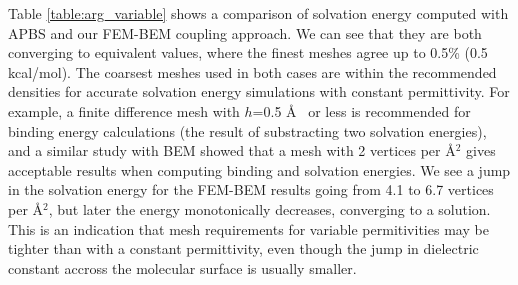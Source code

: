 Table \ref{table:arg_variable} shows a comparison of solvation energy computed with APBS and our FEM-BEM coupling approach. We can see that they are both converging to equivalent values, where the finest meshes agree up to 0.5\% (0.5 kcal/mol). The coarsest meshes used in both cases are within the recommended densities for accurate solvation energy simulations with constant permittivity. For example, a finite difference mesh with $h$=0.5 \AA~ or less is recommended for binding energy calculations\cite{sorensen2015comprehensive} (the result of substracting two solvation energies), and a similar study with BEM\cite{CooperBardhanBarba2014} showed that a mesh with 2 vertices per \AA$^2$ gives acceptable results when computing binding and solvation energies. We see a jump in the solvation energy for the FEM-BEM results going from 4.1 to 6.7 vertices per \AA$^2$, but later the energy monotonically decreases, converging to a solution. This is an indication that mesh requirements for variable permitivities may be tighter than with a constant permittivity, even though the jump in dielectric constant accross the molecular surface is usually smaller. 

